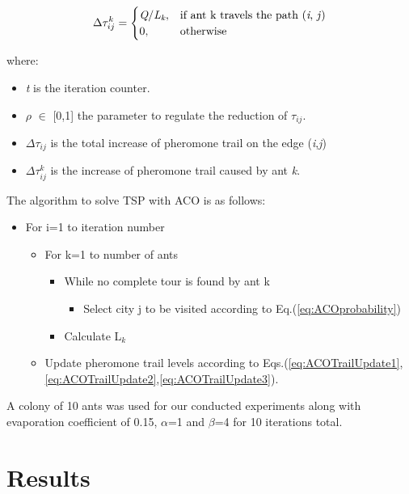 \documentclass[twocolumn]{article}
\begin{document}
	\begin{equation} \label{eq:ACOTrailUpdate3}
	\Delta\tau_{ij}^k = 
	\begin{cases}
	\textit{Q}/\textit{L}_\textit{k},& \text{if ant k travels the path (\textit{i}, \textit{j})}
	\\
	0,& \text{otherwise}
	\end{cases}
	\end{equation}
	
	where:
	\begin{itemize}
		\renewcommand{\labelitemi}{-}
		\item \textit{t} is the iteration counter.
		\item $\rho$ $\in$ [0,1] the parameter to regulate the reduction of $\tau_{ij}$.
		\item $\Delta\tau_{ij}$ is the total increase of pheromone trail on the edge (\textit{i},\textit{j})
		\item $\Delta\tau_{ij}^k$ is the increase of pheromone trail caused by ant \textit{k}.
	\end{itemize}	
	The algorithm to solve TSP with ACO is as follows:
	
	\begin{itemize}
		\item For i=1 to iteration number
		\begin{itemize}
		\item For k=1 to number of ants
			\begin{itemize}
			\item While no complete tour is found by ant k
				\begin{itemize}
				\item Select city j to be visited according to Eq.(\ref{eq:ACOprobability})
				\end{itemize}
			\item Calculate L$_k$
			\end{itemize}
		\item Update pheromone trail levels according to Eqs.(\ref{eq:ACOTrailUpdate1},\ref{eq:ACOTrailUpdate2},\ref{eq:ACOTrailUpdate3}).
		\end{itemize}
	\end{itemize}
	A colony of 10 ants was used for our conducted experiments along with evaporation coefficient of 0.15, $\alpha$=1 and $\beta$=4 for 10 iterations total. 
	\section{Results}
	
\end{document}
